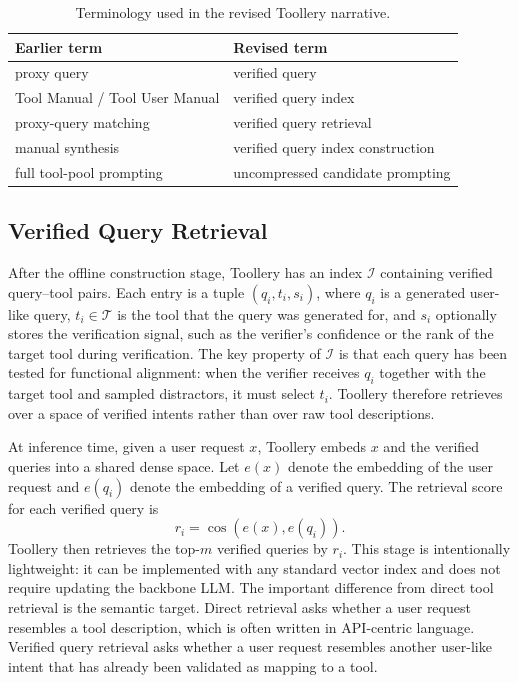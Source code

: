 \begin{table}[t]
\centering
\small
\begin{tabular}{ll}
\hline
Earlier term & Revised term \\
\hline
proxy query & verified query \\
Tool Manual / Tool User Manual & verified query index \\
proxy-query matching & verified query retrieval \\
manual synthesis & verified query index construction \\
full tool-pool prompting & uncompressed candidate prompting \\
\hline
\end{tabular}
\caption{Terminology used in the revised Toollery narrative.}
\label{tab:terminology_update}
\end{table}

\subsection{Verified Query Retrieval}
\label{subsec:verified_query_retrieval}

After the offline construction stage, Toollery has an index $\mathcal{I}$ containing verified query--tool pairs. Each entry is a tuple $(q_i, t_i, s_i)$, where $q_i$ is a generated user-like query, $t_i \in \mathcal{T}$ is the tool that the query was generated for, and $s_i$ optionally stores the verification signal, such as the verifier's confidence or the rank of the target tool during verification. The key property of $\mathcal{I}$ is that each query has been tested for functional alignment: when the verifier receives $q_i$ together with the target tool and sampled distractors, it must select $t_i$. Toollery therefore retrieves over a space of verified intents rather than over raw tool descriptions.

At inference time, given a user request $x$, Toollery embeds $x$ and the verified queries into a shared dense space. Let $e(x)$ denote the embedding of the user request and $e(q_i)$ denote the embedding of a verified query. The retrieval score for each verified query is
\begin{equation}
    r_i = \cos(e(x), e(q_i)).
\end{equation}
Toollery then retrieves the top-$m$ verified queries by $r_i$. This stage is intentionally lightweight: it can be implemented with any standard vector index and does not require updating the backbone LLM. The important difference from direct tool retrieval is the semantic target. Direct retrieval asks whether a user request resembles a tool description, which is often written in API-centric language. Verified query retrieval asks whether a user request resembles another user-like intent that has already been validated as mapping to a tool.

